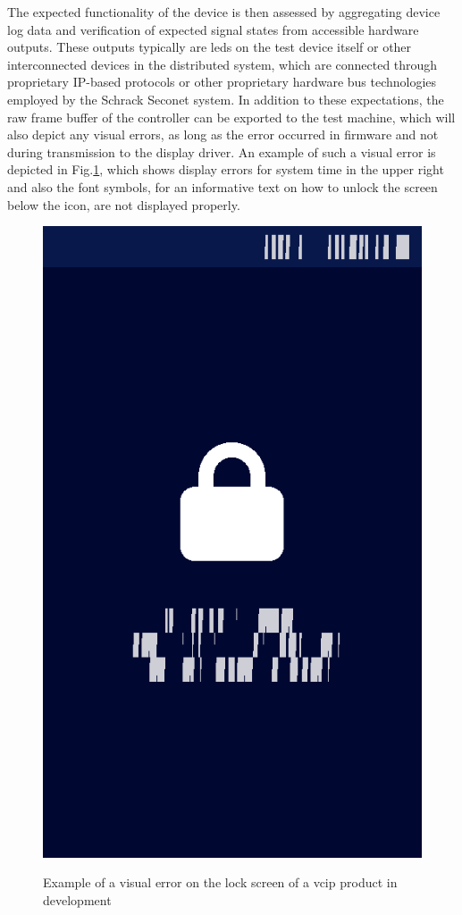 \documentclass[Bachelor, BIC, english, fhCitStyle, IEEE]{BASE/twbook} %
\begin{document}
\noindent
The expected functionality of the device is then assessed by aggregating device log data and verification of expected signal states from accessible hardware outputs. These outputs typically are \acp{led} on the test device itself or other interconnected devices in the distributed system, which are connected through proprietary IP-based protocols or other proprietary hardware bus technologies employed by the Schrack Seconet system. In addition to these expectations, the raw frame buffer of the controller can be exported to the test machine, which will also depict any visual errors, as long as the error occurred in firmware and not during transmission to the display driver. An example of such a visual error is depicted in Fig.\ref{fig:visual-error-example-screendump}, which shows display errors for system time in the upper right and also the font symbols, for an informative text on how to unlock the screen below the icon, are not displayed properly.
\begin{figure}[H]
    \caption{Example of a visual error on the lock screen of a \ac{vcip} product in development}
    \centering
    \includegraphics[height=0.25\textheight]{screen_dump_error.png}
    \label{fig:visual-error-example-screendump}
\end{figure}
\end{document}
